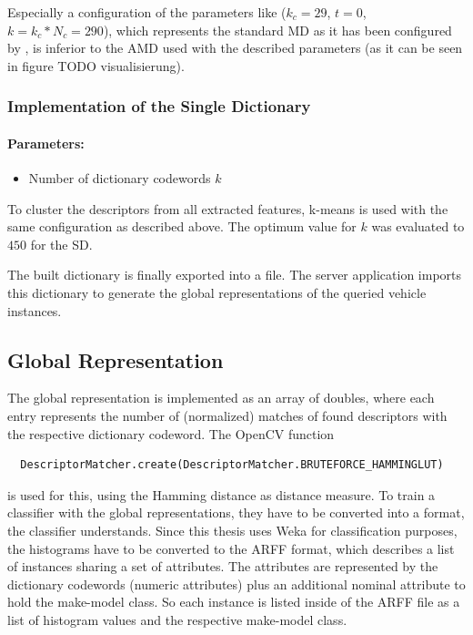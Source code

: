Especially a configuration of the parameters like ($k_c = 29$, $t = 0$, $k = k_c * N_c = 290$), which represents the standard MD as it has been configured by \citep{siddiqui2015robust}, is inferior to the AMD used with the described parameters (as it can be seen in figure TODO visualisierung).

\subsubsection{Implementation of the Single Dictionary}
\paragraph{Parameters:}
\begin{itemize}
  \item Number of dictionary codewords $k$
\end{itemize}
To cluster the descriptors from all extracted features, k-means is used with the same configuration as described above. The optimum value for $k$ was evaluated to $450$ for the SD.

The built dictionary is finally exported into a file. The server application imports this dictionary to generate the global representations of the queried vehicle instances.

\subsection{Global Representation}\label{sec:globalRepresentationImpl}
The global representation is implemented as an array of doubles, where each entry represents the number of (normalized) matches of found descriptors with the respective dictionary codeword. The OpenCV function
\begin{verbatim}
  DescriptorMatcher.create(DescriptorMatcher.BRUTEFORCE_HAMMINGLUT)
\end{verbatim}
is used for this, using the Hamming distance as distance measure. To train a classifier with the global representations, they have to be converted into a format, the classifier understands. Since this thesis uses Weka for classification purposes, the histograms have to be converted to the ARFF format, which describes a list of instances sharing a set of attributes. The attributes are represented by the dictionary codewords (numeric attributes) plus an additional nominal attribute to hold the make-model class. So each instance is listed inside of the ARFF file as a list of histogram values and the respective make-model class.

